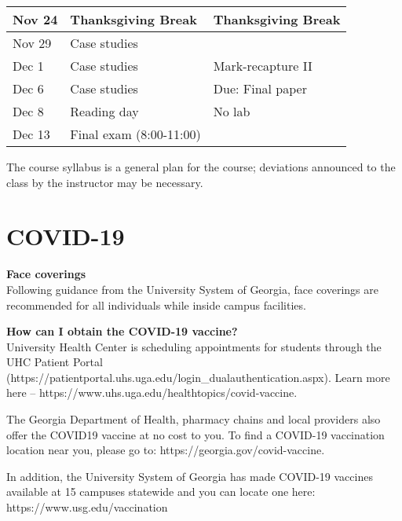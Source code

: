 \documentclass[12pt]{article}
\begin{document}
\begin{center}
\begin{tabular}[c]{lll}
Nov 24     & Thanksgiving Break                 & Thanksgiving Break                   \\
\hline
Nov 29     & Case studies                       &                                      \\
Dec 1      & Case studies                       & Mark-recapture II                    \\
\hline
Dec 6      & Case studies                       & Due: Final paper                     \\
Dec 8      & Reading day                        & No lab                               \\
\hline
Dec 13     & Final exam (8:00-11:00)            &                                      \\
\hline \hline
\end{tabular}
\end{center}

The course syllabus is a general plan for the course; deviations announced to the class by the instructor may be necessary.


\clearpage

\section*{COVID-19}

{\bf Face coverings \\}
Following guidance from the University System of Georgia, face
coverings are recommended for all individuals while inside campus
facilities. 

{\bf How can I obtain the COVID-19 vaccine? \\}
University Health Center is scheduling appointments for students
through the UHC Patient Portal
(https://patientportal.uhs.uga.edu/login\_dualauthentication.aspx). Learn
more here – https://www.uhs.uga.edu/healthtopics/covid-vaccine. 

The Georgia Department of Health, pharmacy chains and local providers
also offer the COVID19 vaccine at no cost to you. To find a COVID-19
vaccination location near you, please go to:
https://georgia.gov/covid-vaccine. 

In addition, the University System of Georgia has made COVID-19
vaccines available at 15 campuses statewide and you can locate one
here: https://www.usg.edu/vaccination 
\end{document}
